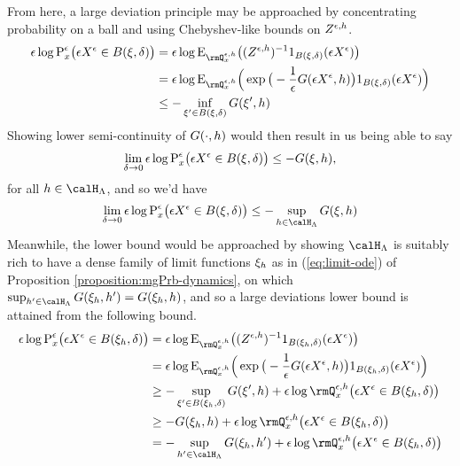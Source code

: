 From here, a large deviation principle may be approached by concentrating probability on a ball and using Chebyshev-like bounds on $Z^{\epsilon,h}$.
\begin{align*}
  \epsilon\log\Prb^\epsilon_\stateVar\big( \Xe \in \ball{\pathVar}{\delta} \big)
  &= \epsilon\log\Exp_{\mgPrb^{\epsilon,\twistFunc}_\stateVar}\big( (\mgDensity^{\epsilon,\twistFunc})^{-1} 1_{\ball{\pathVar}{\delta}}(\Xe) \big) \\
  &= \epsilon\log\Exp_{\mgPrb^{\epsilon,\twistFunc}_\stateVar}\Big( \exp\big(-\frac1\epsilon \mgRf(\Xe, \twistFunc) \big) 1_{\ball{\pathVar}{\delta}}(\Xe) \Big) \\
  &\leq -\inf_{\pathVar' \in \ball{\pathVar}{\delta}} \mgRf(\pathVar', \twistFunc)
\end{align*}
Showing lower semi-continuity of $G(\cdot,h)$ would then result in us being able to say
\begin{equation*}
  \lim_{\delta \rightarrow 0} \epsilon\log{\operatorname{P}}^\epsilon_x\big( \epsilon X^\epsilon \in {B(\xi,\delta)} \big) \leq -G(\xi, h),
\end{equation*}
for all $\twistFunc \in \twistSpace$, and so we'd have
\begin{equation*}
  \lim_{\delta\rightarrow0} \epsilon\log\Prb^\epsilon_\stateVar\big( \Xe \in \ball{\pathVar}{\delta} \big) \leq - \sup_{\twistFunc \in \twistSpace} \mgRf(\pathVar, \twistFunc)
\end{equation*}
Meanwhile, the lower bound would be approached by showing $\twistSpace$ is suitably rich to have a dense family of limit functions $\xi_h$ as in (\ref{eq:limit-ode}) of Proposition \ref{proposition:mgPrb-dynamics}, on which $\sup_{\twistFunc' \in \twistSpace} \mgRf(\pathVar_\twistFunc, \twistFunc') = \mgRf(\pathVar_\twistFunc, \twistFunc)$, and so a large deviations lower bound is attained from the following bound.
\begin{align*}
  \epsilon\log\Prb^\epsilon_\stateVar\big( \Xe \in \ball{\pathVar_\twistFunc}{\delta} \big)
  &= \epsilon\log\Exp_{\mgPrb^{\epsilon,\twistFunc}_\stateVar}\big( (\mgDensity^{\epsilon,\twistFunc})^{-1} 1_{\ball{\pathVar_\twistFunc}{\delta}}(\Xe) \big) \\
  &= \epsilon\log\Exp_{\mgPrb^{\epsilon,\twistFunc}_\stateVar}\Big( \exp\big(-\frac1\epsilon \mgRf(\Xe, \twistFunc) \big) 1_{\ball{\pathVar_\twistFunc}{\delta}}(\Xe) \Big) \\
  &\geq -\sup_{\pathVar' \in \ball{\pathVar_\twistFunc}{\delta}} \mgRf(\pathVar', \twistFunc) + \epsilon\log\mgPrb^{\epsilon,\twistFunc}_\stateVar\big( \Xe \in \ball{\pathVar_\twistFunc}{\delta} \big) \\
  &\geq -\mgRf(\pathVar_\twistFunc, \twistFunc) + \epsilon\log\mgPrb^{\epsilon,\twistFunc}_\stateVar\big( \Xe \in \ball{\pathVar_\twistFunc}{\delta} \big) \\
  &= -\sup_{\twistFunc' \in \twistSpace} \mgRf(\pathVar_\twistFunc, \twistFunc') + \epsilon\log\mgPrb^{\epsilon,\twistFunc}_\stateVar\big( \Xe \in \ball{\pathVar_\twistFunc}{\delta} \big)
\end{align*}

